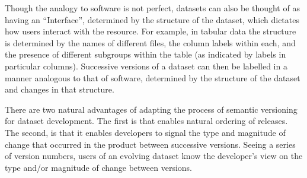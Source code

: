 \documentclass[a4paper,num-refs]{assets/oup-contemporary}
\begin{document}
Though the analogy to software is not perfect, datasets can also be thought of as having an ``Interface'', determined by the structure of the dataset, which dictates how users interact with the resource. For example, in tabular data the structure is determined by the names of different files, the column labels within each, and the presence of different subgroups within the table (as indicated by labels in particular columns). Successive versions of a dataset can then be labelled in a manner analogous to that of software, determined by the structure of the dataset and changes in that structure.

There are two natural advantages of adapting the process of semantic versioning for dataset development. The first is that enables natural ordering of releases. The second, is that it enables developers to signal the type and magnitude of change that occurred in the product between successive versions. Seeing a series of version numbers, users of an evolving dataset know the developer's view on the type and/or magnitude of change between versions.
\end{document}
